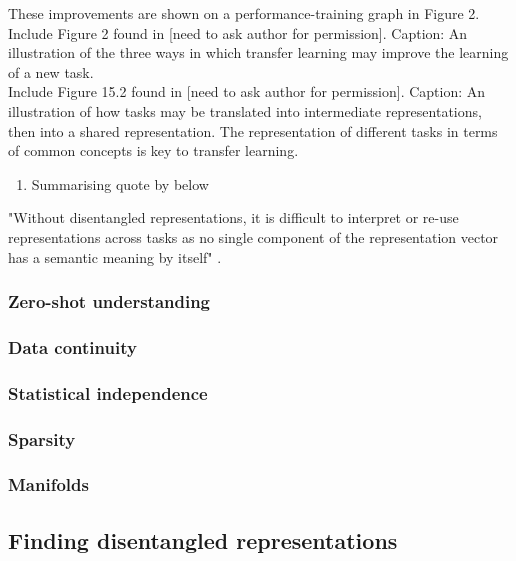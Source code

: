 \documentclass[12pt,twoside]{article}
\begin{document}
These improvements are shown on a performance-training graph in Figure 2.\\

Include Figure 2 found in \cite{Torrey2009} [need to ask author for permission]. Caption: An illustration of the three ways in which transfer learning may improve the learning of a new task.\\


Include Figure 15.2 found in \cite{IanGoodfellowYoshuaBengio2015} [need to ask author for permission]. Caption: An illustration of how tasks may be translated into intermediate representations, then into a shared representation. The representation of different tasks in terms of common concepts is key to transfer learning.\\

\begin{enumerate}
\item Summarising quote by \cite{Whitney2016} below
\end{enumerate}

"Without disentangled representations, it is difficult to interpret or re-use representations across tasks as no single component of the representation vector has a semantic meaning by itself" \cite{Whitney2016}.

\subsubsection{Zero-shot understanding}

\subsubsection{Data continuity}

\subsubsection{Statistical independence}

\subsubsection{Sparsity}

\subsubsection{Manifolds}

\subsection{Finding disentangled representations}
\end{document}
